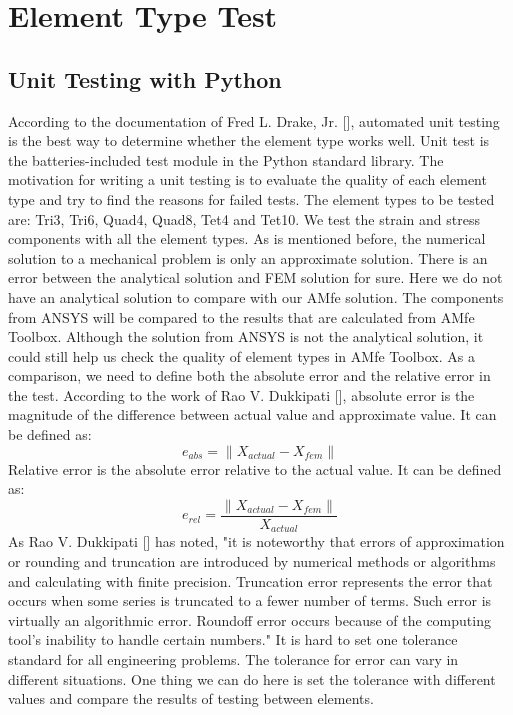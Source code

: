 \chapter{Element Type Test}
\section{Unit Testing with Python}
According to the documentation of Fred L. Drake, Jr. [\cite{Python}], automated unit testing is the best way to determine whether the element type works well. Unit test is the batteries-included test module in the Python standard library. The motivation for writing a unit testing is to evaluate the quality of each element type and try to find the reasons for failed tests. The element types to be tested are: Tri3, Tri6, Quad4, Quad8, Tet4 and Tet10. We test the strain and stress components with all the element types. As is mentioned before, the numerical solution to a mechanical problem is only an approximate solution. There is an error between the analytical solution and FEM solution for sure. Here we do not have an analytical solution to compare with our AMfe solution. The components from ANSYS will be compared to the results that are calculated from AMfe Toolbox. Although the solution from ANSYS is not the analytical solution, it could still help us check the quality of element types in AMfe Toolbox. As a comparison, we need to define both the absolute error and the relative error in the test. According to the work of Rao V. Dukkipati [\cite{NumericalMethod}], absolute error is the magnitude of the difference between actual value and approximate value. It can be defined as:
\begin{equation}
e_{abs} = \|X_{actual} - X_{fem} \|
\end{equation}
Relative error is the absolute error relative to the actual value. It can be defined as:
\begin{equation}
e_{rel} = \frac{\|X_{actual} - X_{fem} \|}{X_{actual}}
\end{equation} 
As Rao V. Dukkipati [\cite{NumericalMethod}] has noted, "it is noteworthy that errors of approximation or rounding and truncation are introduced by numerical methods or algorithms and calculating with finite precision. Truncation error represents the error that occurs when some series is truncated to a fewer number of terms. Such error is virtually an algorithmic error. Roundoff error occurs because of the computing tool's inability to handle certain numbers." It is hard to set one tolerance standard for all engineering problems. The tolerance for error can vary in different situations. One thing we can do here is set the tolerance with different values and compare the results of testing between elements. 
